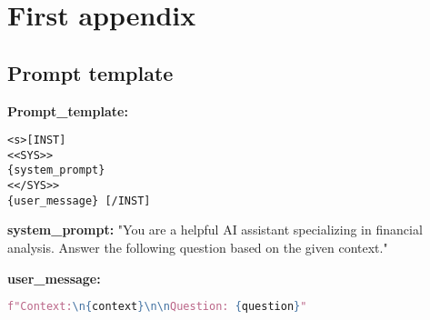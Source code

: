 \documentclass[logo,msc]{infthesis}           %
\begin{document}




\appendix

\chapter{First appendix}

\section{Prompt template}
\label{sec:Prompt template-llama2-7b-chathf}
\begin{tcolorbox}[
    colback=blue!5!white, %
    colframe=white!75!black, %
    width=\textwidth, %
    boxrule=0.5mm, %
    sharp corners, %
    title=PROMPT TEMPLATE FOR LLAMA2-7B-CHAT-HF,
    fonttitle=\bfseries,
    coltitle=black,
    toptitle=3mm, %
    bottomtitle=3mm %
    ]

\textbf{Prompt\_template:}

\begin{lstlisting}[language={}, basicstyle=\ttfamily\small, frame=single, backgroundcolor=\color{gray!10}]
<s>[INST]
<<SYS>>
{system_prompt}
<</SYS>>
{user_message} [/INST]
\end{lstlisting}

\textbf{system\_prompt:} "You are a helpful AI assistant specializing in financial analysis. Answer the following question based on the given context."

\textbf{user\_message:}
\begin{lstlisting}[language=Python, basicstyle=\ttfamily\small, frame=single, backgroundcolor=\color{gray!10}]
f"Context:\n{context}\n\nQuestion: {question}"
\end{lstlisting}
\end{tcolorbox}
\end{document}
